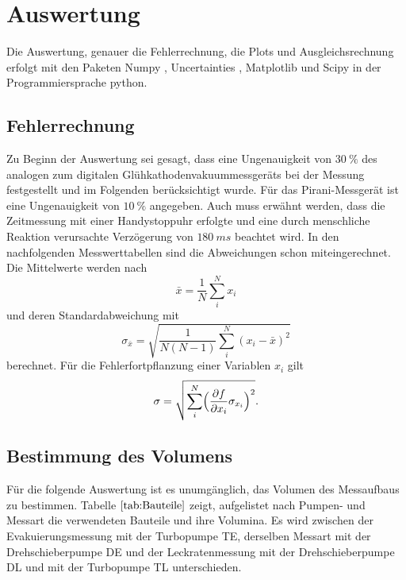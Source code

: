 \section{Auswertung}
Die Auswertung, genauer die Fehlerrechnung, die Plots und Ausgleichsrechnung erfolgt mit den Paketen
Numpy \cite{numpy}, Uncertainties \cite{uncertainties}, Matplotlib \cite{matplotlib} und Scipy \cite{scipy} in der Programmiersprache python.
\subsection{Fehlerrechnung}
Zu Beginn der Auswertung sei gesagt, dass eine Ungenauigkeit von $\SI{30}{\percent}$ des analogen zum digitalen Glühkathodenvakuummessgeräts
bei der Messung festgestellt und im Folgenden berücksichtigt wurde.
Für das Pirani-Messgerät ist eine Ungenauigkeit von $\SI{10}{\percent}$ angegeben\cite{anleitung}.
Auch muss erwähnt werden, dass die Zeitmessung mit einer Handystoppuhr erfolgte und eine durch menschliche Reaktion verursachte
Verzögerung von $\SI{180}{ms}$ beachtet wird\cite{reaktion}.
In den nachfolgenden Messwerttabellen sind die Abweichungen schon miteingerechnet.\\
Die Mittelwerte werden nach
\begin{equation}
	\bar{x}=\frac{1}{N}\sum_{i}^N x_i
\end{equation}
und deren Standardabweichung mit
\begin{equation}
	\sigma_{\bar{x}} = \sqrt{\frac{1}{N(N-1)} \sum_{i}^N (x_i-\bar{x})^2}
\end{equation}
berechnet.
Für die Fehlerfortpflanzung einer Variablen $x_i$ gilt
\begin{equation}
	\sigma = \sqrt{\sum_{i}^N \Bigl(\frac{\partial f}{\partial x_i} \sigma_{x_i}\Bigr)^2}.
	\label{eq:gaussfehler}
\end{equation}
\subsection{Bestimmung des Volumens}
Für die folgende Auswertung ist es unumgänglich, das Volumen des Messaufbaus zu bestimmen.
Tabelle $\ref{tab:Bauteile}$ zeigt, aufgelistet nach Pumpen- und Messart die verwendeten Bauteile und ihre Volumina.
Es wird zwischen der Evakuierungsmessung mit der Turbopumpe TE, derselben Messart mit der Drehschieberpumpe DE und der Leckratenmessung
mit der Drehschieberpumpe DL und mit der Turbopumpe TL unterschieden.\newline


